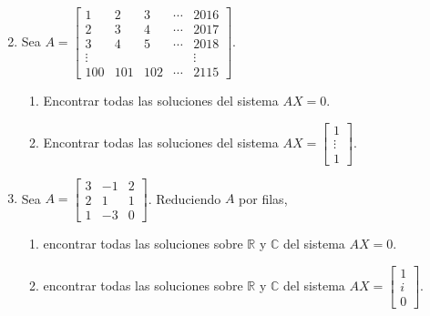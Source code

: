 \begin{enumerate}[topsep=6pt, itemsep=.4cm]
\begin{multicols}{2}
\end{multicols}



\item Sea $A=\begin{bmatrix}1 & 2 & 3 & \cdots & 2016 \\ 2 & 3 & 4 & \cdots & 2017 \\ 3&4&5& \cdots & 2018\\ \vdots & &&& \vdots \\ 100 & 101 & 102& \cdots& 2115\end{bmatrix}$.


\begin{enumerate}
   \item Encontrar todas las soluciones del sistema $AX=0$.
   \item Encontrar todas las soluciones del sistema $AX=\left[\begin{array}{c}
     1\\\vdots \\1 \end{array}\right]$.
\end{enumerate}



     \item Sea $A=\begin{bmatrix}3 & -1 & 2 \\2 & 1 & 1 \\1&-3&0\end{bmatrix}$. Reduciendo $A$ por filas,
 \begin{enumerate}
   \item encontrar todas las soluciones sobre $\mathbb{R}$ y $\mathbb{C}$ del sistema $AX=0$.
   \item encontrar todas las soluciones sobre $\mathbb{R}$ y $\mathbb{C}$ del sistema $AX=\left[\begin{array}{c}
     1\\i\\0 \end{array}\right]$.
 \end{enumerate}



\end{enumerate}
